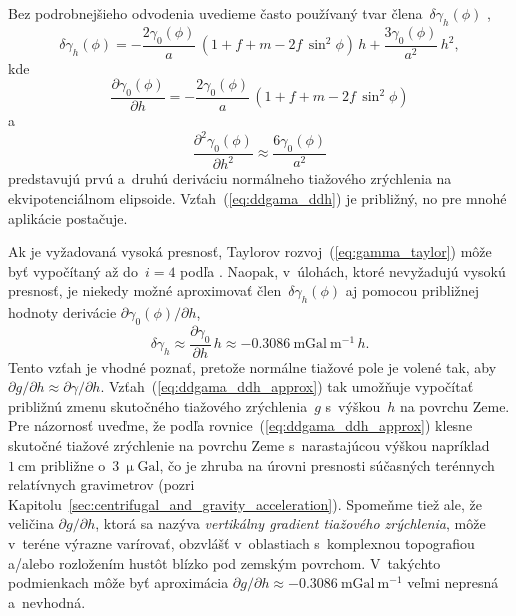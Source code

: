 \documentclass[a4paper,12pt]{book}
\begin{document}
Bez podrobnejšieho odvodenia uvedieme často používaný tvar 
člena~$\delta\gamma_h(\phi)$ \parencite[pozri 
napríklad][]{MoritzPhysicalGeodesy},
%
\begin{equation}
\delta\gamma_h(\phi) = -\frac{2\gamma_0(\phi)}{a} \, (1 + f + m - 2f \, 
\sin^2\phi) \, h + \frac{3\gamma_0(\phi)}{a^2} \, h^2{,}
\end{equation}
%
kde
%
\begin{equation}
\frac{\partial \gamma_0(\phi)}{\partial h} = -\frac{2\gamma_0(\phi)}{a} \, (1 
+ f + m - 2f \, \sin^2\phi)
\end{equation}
%
a
%
\begin{equation}
\label{eq:ddgama_ddh}
\frac{\partial^2 \gamma_0(\phi)}{\partial h^2} \approx 
\frac{6\gamma_0(\phi)}{a^2}
\end{equation}
%
predstavujú prvú a~druhú deriváciu normálneho tiažového zrýchlenia na 
ekvipotenciálnom elipsoide.  Vzťah~(\ref{eq:ddgama_ddh}) je približný, no pre 
mnohé aplikácie postačuje.

Ak je vyžadovaná vysoká presnosť, Taylorov rozvoj~(\ref{eq:gamma_taylor}) môže 
byť vypočítaný až do~$i = 4$ podľa \textcite{Pick2000}.  Naopak, v~úlohách, 
ktoré nevyžadujú vysokú presnosť, je niekedy možné aproximovať 
člen~$\delta\gamma_h(\phi)$ aj pomocou približnej hodnoty derivácie $\partial 
\gamma_0(\phi) \slash \partial h$,
%
\begin{equation}
\label{eq:ddgama_ddh_approx}
\delta\gamma_h \approx \frac{\partial \gamma_0}{\partial h} \, h \approx 
-0.3086 \ \mathrm{mGal} \ \mathrm{m}^{-1} \, h{.}
\end{equation}
%
Tento vzťah je vhodné poznať, pretože normálne tiažové pole je volené tak, aby 
$\partial g \slash \partial h \approx \partial \gamma \slash \partial h$.  
Vzťah~(\ref{eq:ddgama_ddh_approx}) tak umožňuje vypočítať približnú zmenu 
skutočného tiažového zrýchlenia~$g$ s~výškou~$h$ na povrchu Zeme.  Pre 
názornosť uveďme, že podľa rovnice~(\ref{eq:ddgama_ddh_approx}) klesne skutočné 
tiažové zrýchlenie na povrchu Zeme s~narastajúcou výškou napríklad~$1 
\ \mathrm{cm}$ približne o~$3 \ \upmu\mathrm{Gal}$, čo je zhruba na úrovni 
presnosti súčasných terénnych relatívnych gravimetrov (pozri 
Kapitolu~\ref{sec:centrifugal_and_gravity_acceleration}).  Spomeňme tiež ale, 
že veličina $\partial g \slash \partial h$, ktorá sa nazýva \emph{vertikálny 
gradient tiažového zrýchlenia}, môže v~teréne výrazne varírovať, obzvlášť 
v~oblastiach s~komplexnou topografiou a/alebo rozložením hustôt blízko pod 
zemským povrchom.  V~takýchto podmienkach môže byť aproximácia $\partial 
g \slash \partial h \approx -0.3086 \ \mathrm{mGal} \ \mathrm{m}^{-1}$ veľmi 
nepresná a~nevhodná.
\end{document}
